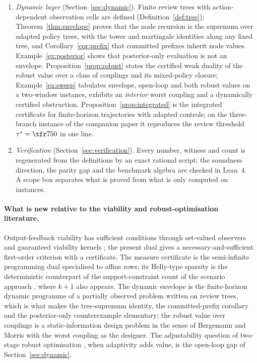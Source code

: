 \begin{enumerate}[leftmargin=1.6em,itemsep=1pt]
\item \emph{Dynamic layer} (Section~\ref{sec:dynamic}). Finite review trees with action-dependent observation cells are defined (Definition~\ref{def:tree}); Theorem~\ref{thm:envelope} proves that the node recursion is the supremum over adapted policy trees, with the tower and martingale identities along any fixed tree, and Corollary~\ref{cor:prefix} that committed prefixes inherit node values. Example~\ref{ex:posterior} shows that posterior-only evaluation is not an envelope. Proposition~\ref{prop:robust} states the certified weak duality of the robust value over a class of couplings and its mixed-policy closure; Example~\ref{ex:sweep} tabulates envelope, open-loop and both robust values on a two-window instance, exhibits an \emph{interior} worst coupling and a dynamically certified obstruction. Proposition~\ref{prop:integrated} is the integrated certificate for finite-horizon trajectories with adapted controls; on the three-branch instance of the companion paper \cite{Abaee2026cert} it reproduces the review threshold $\tau^\ast=\tfr7{50}$ in one line.
\item \emph{Verification} (Section~\ref{sec:verification}). Every number, witness and count is regenerated from the definitions by an exact rational script; the soundness direction, the parity gap and the benchmark algebra are checked in Lean~4. A scope box separates what is proved from what is only computed on instances.
\end{enumerate}

\paragraph{What is new relative to the viability and robust-optimisation literature.} Output-feedback viability has sufficient conditions through set-valued observers and guaranteed viability kernels \cite{Aubin2011,Cardaliaguet2007}; the present dual gives a necessary-and-sufficient first-order criterion with a certificate. The measure certificate is the semi-infinite programming dual \cite{HettichKortanek1993,AndersonNash1987} specialised to affine rows; its Helly-type sparsity is the deterministic counterpart of the support-constraint count of the scenario approach \cite{CalafioreCampi2006,CampiGaratti2008}, where $k+1$ also appears. The dynamic envelope is the finite-horizon dynamic programme of a partially observed problem \cite{Astrom1965,BertsekasShreve1978} written on review trees, which is what makes the tree-supremum identity, the committed-prefix corollary and the posterior-only counterexample elementary; the robust value over couplings is a static-information design problem in the sense of Bergemann and Morris \cite{BergemannMorris2019} with the worst coupling as the designer. The adjustability question of two-stage robust optimisation \cite{WeiZhang2024}, when adaptivity adds value, is the open-loop gap of Section~\ref{sec:dynamic}.

